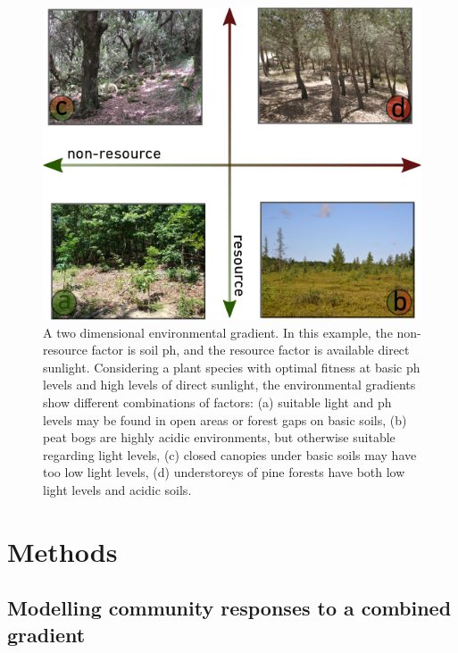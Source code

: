\begin{figure}[ht]
\includegraphics[width=\textwidth]{./Figures/chapter06/Fig_1.png}
\caption[Resource and non-resource environmental gradients]{\color{Gray} A two dimensional environmental gradient. In this example, the non-resource factor  is soil ph, and the resource factor is available direct sunlight. Considering a plant species with optimal fitness at basic ph levels and high levels of direct sunlight, the environmental gradients show different combinations of factors: (a) suitable light and ph levels may be found in open areas or forest gaps on basic soils, (b) peat bogs are highly acidic environments, but otherwise suitable regarding light levels, (c) closed canopies under basic soils may have too low light levels, (d) understoreys of pine forests have both low light levels and acidic soils.}
\label{fig:fig6.1}
\end{figure}

\section{Methods}

\subsection*{Modelling community responses to a combined gradient}

